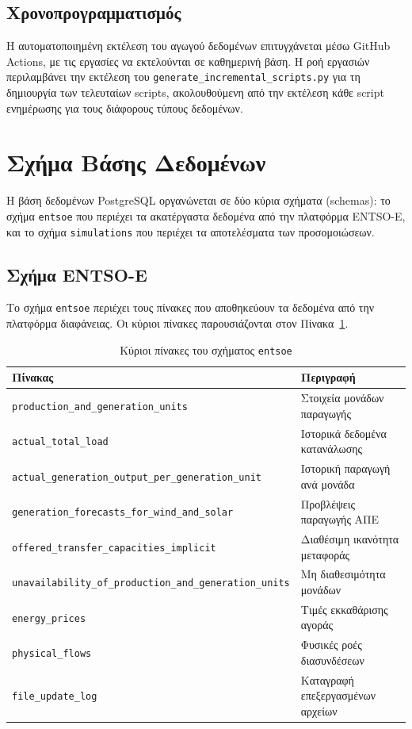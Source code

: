 \subsection{Χρονοπρογραμματισμός}
\label{subsec:scheduling}

Η αυτοματοποιημένη εκτέλεση του αγωγού δεδομένων επιτυγχάνεται μέσω GitHub Actions, με τις εργασίες να εκτελούνται σε καθημερινή βάση. Η ροή εργασιών περιλαμβάνει την εκτέλεση του \texttt{generate\_incremental\_scripts.py} για τη δημιουργία των τελευταίων scripts, ακολουθούμενη από την εκτέλεση κάθε script ενημέρωσης για τους διάφορους τύπους δεδομένων.


\section{Σχήμα Βάσης Δεδομένων}
\label{sec:database-schema}

Η βάση δεδομένων PostgreSQL οργανώνεται σε δύο κύρια σχήματα (schemas): το σχήμα \texttt{entsoe} που περιέχει τα ακατέργαστα δεδομένα από την πλατφόρμα ENTSO-E, και το σχήμα \texttt{simulations} που περιέχει τα αποτελέσματα των προσομοιώσεων.

\subsection{Σχήμα ENTSO-E}
\label{subsec:entsoe-schema}

Το σχήμα \texttt{entsoe} περιέχει τους πίνακες που αποθηκεύουν τα δεδομένα από την πλατφόρμα διαφάνειας. Οι κύριοι πίνακες παρουσιάζονται στον Πίνακα~\ref{tab:entsoe-tables}.

\begin{table}[htbp]
\centering
\caption{Κύριοι πίνακες του σχήματος \texttt{entsoe}}
\label{tab:entsoe-tables}
\begin{tabular}{@{}p{5.5cm}p{8cm}@{}}
\toprule
\textbf{Πίνακας} & \textbf{Περιγραφή} \\
\midrule
\texttt{production\_and\_generation\_units} & Στοιχεία μονάδων παραγωγής \\
\texttt{actual\_total\_load} & Ιστορικά δεδομένα κατανάλωσης \\
\texttt{actual\_generation\_output\_per\_generation\_unit} & Ιστορική παραγωγή ανά μονάδα \\
\texttt{generation\_forecasts\_for\_wind\_and\_solar} & Προβλέψεις παραγωγής ΑΠΕ \\
\texttt{offered\_transfer\_capacities\_implicit} & Διαθέσιμη ικανότητα μεταφοράς \\
\texttt{unavailability\_of\_production\_and\_generation\_units} & Μη διαθεσιμότητα μονάδων \\
\texttt{energy\_prices} & Τιμές εκκαθάρισης αγοράς \\
\texttt{physical\_flows} & Φυσικές ροές διασυνδέσεων \\
\texttt{file\_update\_log} & Καταγραφή επεξεργασμένων αρχείων \\
\bottomrule
\end{tabular}
\end{table}

